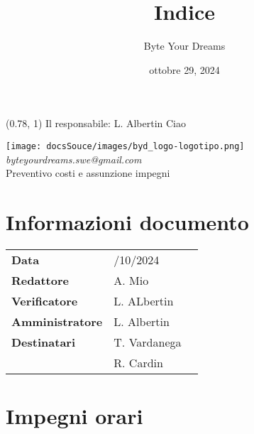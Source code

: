 \documentclass{article}
\title{\textbf{\fontsize{28}{6}\selectfont Indice}}
\author{\fontsize{14}{6}\selectfont Byte Your Dreams}
\date{ottobre 29, 2024}
\begin{document}
\begin{textblock*}{\textwidth}(0.78\textwidth, 1\textheight)
    Il responsabile: L. Albertin Ciao
\end{textblock*}
\pagestyle{fancy}
\begin{center}
\vspace*{-2cm}
\texttt{[image: docsSouce/images/byd\_logo-logotipo.png]}
\fontsize{12}{6}\textcolor[RGB]{60, 60, 60}{\textit{byteyourdreams.swe@gmail.com}} \\
\vspace{0.5cm}
\fontsize{16}{6}\selectfont Preventivo costi e assunzione impegni \\
\vspace{0.5cm}
\end{center}

\section*{Informazioni documento}
\def\arraystretch{1.2}
\begin{tabular}{>{\raggedleft\arraybackslash}p{}|>{\raggedright\arraybackslash}p{}c}
\hline
\addlinespace
\textbf{Data} & 29/10/2024 \vspace{10pt} \\
\textbf{Redattore} & A. Mio \vspace{10pt} \\
\textbf{Verificatore} & L. ALbertin \vspace{10pt} \\
\textbf{Amministratore} & L. Albertin \vspace{10pt} \\
\textbf{Destinatari} & T. Vardanega \\ & R. Cardin \vspace{10pt}
\end{tabular}

\pagebreak 





\flushleft

\section{Impegni orari}
\end{document}
